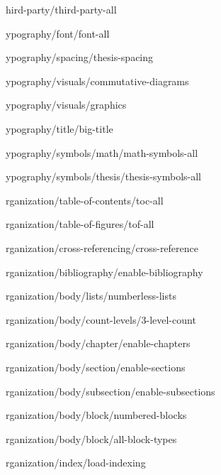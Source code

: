 
\def\loadOption #1{}

\loadOption third-party/third-party-all

\loadOption typography/font/font-all

\loadOption typography/spacing/thesis-spacing

\loadOption typography/visuals/commutative-diagrams

\loadOption typography/visuals/graphics

\loadOption typography/title/big-title

\loadOption typography/symbols/math/math-symbols-all

\loadOption typography/symbols/thesis/thesis-symbols-all


\loadOption organization/table-of-contents/toc-all

\loadOption organization/table-of-figures/tof-all

\loadOption organization/cross-referencing/cross-reference

\loadOption organization/bibliography/enable-bibliography

\loadOption organization/body/lists/numberless-lists

\loadOption organization/body/count-levels/3-level-count

\loadOption organization/body/chapter/enable-chapters

\loadOption organization/body/section/enable-sections

\loadOption organization/body/subsection/enable-subsections

\loadOption organization/body/block/numbered-blocks

\loadOption organization/body/block/all-block-types

\loadOption organization/index/load-indexing
